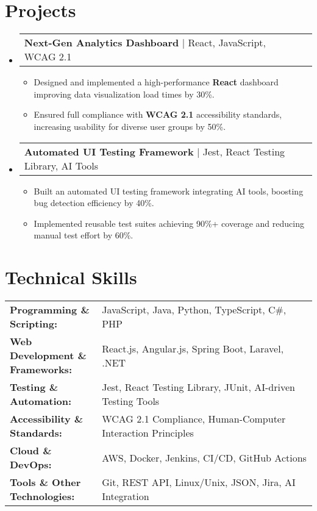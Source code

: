 \documentclass[letterpaper,11pt]{article}
\makeatletter
\newcommand{\resumeItem}[1]{
  \item\footnotesize{
    {#1 \vspace{-2pt}}
  }
}
\newcommand{\resumeProjectHeading}[2]{
    \item
    \begin{tabular*}{1.001\textwidth}{l@{\extracolsep{\fill}}r}
      \small#1 & \textbf{\small #2}\\
    \end{tabular*}\vspace{-7pt}
}
\newcommand{\resumeSubHeadingListStart}{\begin{itemize}[leftmargin=0pt, label={}]}
\newcommand{\resumeSubHeadingListEnd}{\end{itemize}}
\newcommand{\resumeItemListStart}{\begin{itemize}[leftmargin=*]}
\newcommand{\resumeItemListEnd}{\end{itemize}\vspace{-5pt}}
\makeatother
\begin{document}
\section{Projects}
    \vspace{-5pt}
    \resumeSubHeadingListStart
      \resumeProjectHeading
          {\textbf{Next-Gen Analytics Dashboard} | React, JavaScript, WCAG 2.1}{}
          \resumeItemListStart
              \resumeItem{Designed and implemented a high-performance \textbf{React} dashboard improving data visualization load times by 30\%.}
              \resumeItem{Ensured full compliance with \textbf{WCAG 2.1} accessibility standards, increasing usability for diverse user groups by 50\%.}
          \resumeItemListEnd
          \vspace{-16pt}
      \resumeProjectHeading
          {\textbf{Automated UI Testing Framework} | Jest, React Testing Library, AI Tools}{}
          \resumeItemListStart
              \resumeItem{Built an automated UI testing framework integrating AI tools, boosting bug detection efficiency by 40\%.}
              \resumeItem{Implemented reusable test suites achieving 90\%+ coverage and reducing manual test effort by 60\%.}
          \resumeItemListEnd
    \resumeSubHeadingListEnd
\vspace{-10pt}
\section{Technical Skills}
        \vspace{-14pt}
        \begin{table}[h]
            \footnotesize
            \begin{tabular}{p{0.3\linewidth} p{0.7\linewidth}}
                \textbf{Programming \& Scripting:} & JavaScript, Java, Python, TypeScript, C\#, PHP \\
                \textbf{Web Development \& Frameworks:} & React.js, Angular.js, Spring Boot, Laravel, .NET \\
                \textbf{Testing \& Automation:} & Jest, React Testing Library, JUnit, AI-driven Testing Tools \\
                \textbf{Accessibility \& Standards:} & WCAG 2.1 Compliance, Human-Computer Interaction Principles \\
                \textbf{Cloud \& DevOps:} & AWS, Docker, Jenkins, CI/CD, GitHub Actions \\
                \textbf{Tools \& Other Technologies:} & Git, REST API, Linux/Unix, JSON, Jira, AI Integration \\
            \end{tabular}
        \end{table}
\end{document}
